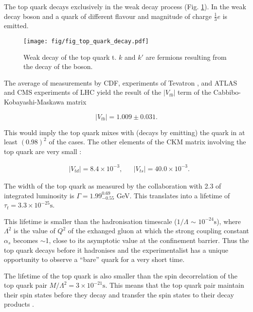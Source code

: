 The top quark decays exclusively in the weak decay process (Fig. \ref{fig:quark_decay}). In the weak decay \PW boson and a quark of different flavour and magnitude of charge $\frac{1}{3}e$ is emitted. 
\begin{figure}[H]
  \centering
  \texttt{[image: fig/fig\_top\_quark\_decay.pdf]}
  \caption{Weak decay of the top quark t. $k$ and $k'$ are fermions resulting from the decay of the \PW boson.}
  \label{fig:quark_decay}
\end{figure}

The average of measurements by CDF, \DZERO experiments of Tevatron \cite{Aaltonen:2015cra}, and ATLAS and CMS experiments of LHC \cite{twiki:tt_curve_toplhcwg_sep18} yield the result of the $|V_{tb}|$ term of the Cabbibo-Kobayashi-Maskawa matrix

\begin{equation}
  |V_{tb}|=1.009\pm0.031.
\end{equation}

This would imply the top quark mixes with (decays by emitting) the \cPqb quark in at least $(0.98)^{2}$ of the cases. The other elements of the CKM matrix involving the top quark are very small \cite{Patrignani:2016xqp}:

\begin{align}
  & |V_{td}|=8.4\times10^{-3}, && |V_{ts}|=40.0\times10^{-3}.
\end{align}

The width of the top quark as measured by the \DZERO collaboration \cite{Abazov:2010tm} with 2.3 \fbinv of integrated luminosity is $\Gamma=1.99^{0.69}_{-0.55}$ GeV. This translates into a lifetime of $\tau_{t}=3.3\times10^{-25}\text{s}$.

This lifetime is smaller than the hadronisation timescale ($1/\Lambda$ $\sim$ $10^{-24}\text{s}$), where $\Lambda^{2}$ is the value of $Q^{2}$ of the exhanged gluon at which the strong coupling constant $\alpha_{s}$ becomes $\sim$1, close to its asymptotic value at the confinement barrier. Thus the top quark decays before it hadronises and the experimentalist has a unique opportunity to observe a ``bare'' quark for a very short time.

The lifetime of the top quark is also smaller than the spin decorrelation of the top quark pair $M/{\Lambda^{2}}=3\times 10^{-21}\text{s}$. This means that the top quark pair maintain their spin states before they decay and transfer the spin states to their decay products \cite{Cristinziani:2016vif}.

